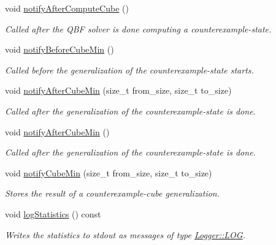 \begin{DoxyCompactItemize}
void \hyperlink{classLearnStatisticsQBF_acb35168104b3c8d3d529c93967c8ebbc}{notify\-After\-Compute\-Cube} ()
\begin{DoxyCompactList}\small\item\em Called after the Q\-B\-F solver is done computing a counterexample-\/state. \end{DoxyCompactList}\item 
void \hyperlink{classLearnStatisticsQBF_a423645758d7dc73103dc27c36544432e}{notify\-Before\-Cube\-Min} ()
\begin{DoxyCompactList}\small\item\em Called before the generalization of the counterexample-\/state starts. \end{DoxyCompactList}\item 
void \hyperlink{classLearnStatisticsQBF_a6fe040a580ab91a1ced5334028bb8cf7}{notify\-After\-Cube\-Min} (size\-\_\-t from\-\_\-size, size\-\_\-t to\-\_\-size)
\begin{DoxyCompactList}\small\item\em Called after the generalization of the counterexample-\/state is done. \end{DoxyCompactList}\item 
void \hyperlink{classLearnStatisticsQBF_ad6964e03b41d0e14834a06aa034c30e3}{notify\-After\-Cube\-Min} ()
\begin{DoxyCompactList}\small\item\em Called after the generalization of the counterexample-\/state is done. \end{DoxyCompactList}\item 
void \hyperlink{classLearnStatisticsQBF_a4c17af33270921d54e425cd6d14b1a78}{notify\-Cube\-Min} (size\-\_\-t from\-\_\-size, size\-\_\-t to\-\_\-size)
\begin{DoxyCompactList}\small\item\em Stores the result of a counterexample-\/cube generalization. \end{DoxyCompactList}\item 
void \hyperlink{classLearnStatisticsQBF_a6746f60721bd214d479a3e48e7246f3f}{log\-Statistics} () const 
\begin{DoxyCompactList}\small\item\em Writes the statistics to stdout as messages of type \hyperlink{classLogger_ac9e601f90bf326ce2088de52018861dca07be7495a7931bee16f5d94b3671f5de}{Logger\-::\-L\-O\-G}. \end{DoxyCompactList}\end{DoxyCompactItemize}
